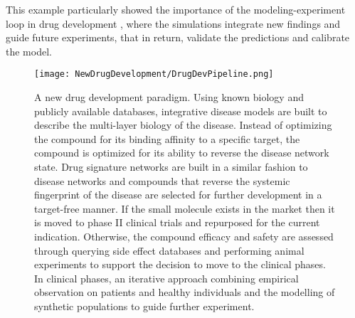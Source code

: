 This example particularly showed the importance of the modeling-experiment loop in drug development \cite{krauss2017translational,kuepfer2012multiscale}, where the simulations integrate new findings and guide future experiments, that in return, validate the predictions and calibrate the model.
\begin{figure}[!htp]
\centering
	\texttt{[image: NewDrugDevelopment/DrugDevPipeline.png]}%
	\caption[A new drug development paradigm.]{A new drug development paradigm. Using known biology and publicly available databases, integrative disease models are built to describe the multi-layer biology of the disease. Instead of optimizing the compound for its binding affinity to a specific target, the compound is optimized for its ability to reverse the disease network state. Drug signature networks are built in a similar fashion to disease networks and compounds that reverse the systemic fingerprint of the disease are selected for further development in a target-free manner. If the small molecule exists in the market then it is moved to phase II clinical trials and repurposed for the current indication. Otherwise, the compound efficacy and safety are assessed through querying side effect databases and performing animal experiments to support the decision to move to the clinical phases. In clinical phases, an iterative approach combining empirical observation on patients and healthy individuals and the modelling of synthetic populations to guide further experiment.}
	\label{fig:newparadigm}
\end{figure}
